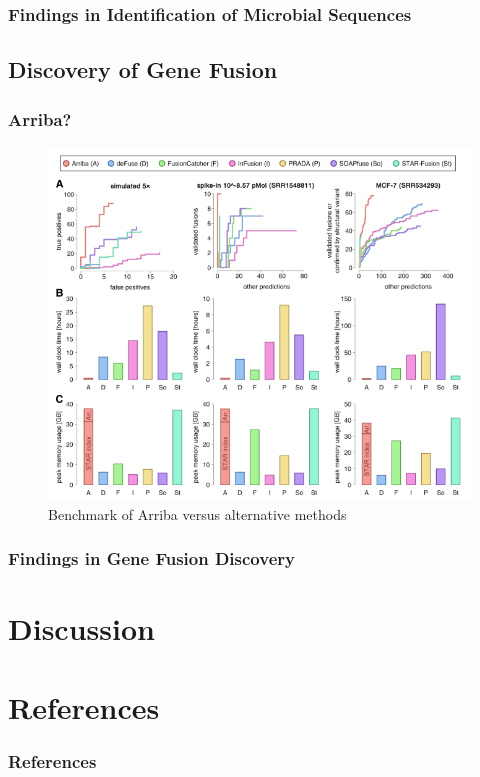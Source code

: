 \documentclass{beamer}
\begin{document}
    \begin{frame}
        \frametitle{Findings in Identification of Microbial Sequences}
    \end{frame}

    \subsection{Discovery of Gene Fusion}
    \begin{frame}
        \frametitle{Arriba?}

        \begin{figure}
            \includegraphics[width=0.6 \linewidth]{figures/Workflow/Arriba.png}
            \caption{Benchmark of Arriba versus alternative methods \protect\cite{Arriba1}}
        \end{figure}
    \end{frame}

    \begin{frame}
        \frametitle{Findings in Gene Fusion Discovery}
    \end{frame}

    \section{Discussion}

    \section{References}
    \begin{frame}[allowframebreaks]
        \frametitle{References}
        
        
    \end{frame}
\end{document}
